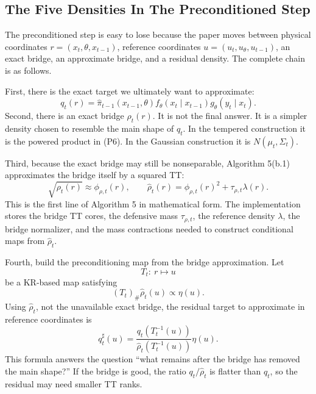 \documentclass[11pt]{article}
\begin{document}
\subsection{The Five Densities In The Preconditioned Step}

The preconditioned step is easy to lose because the paper moves between
physical coordinates \(r=(x_t,\theta,x_{t-1})\), reference coordinates
\(u=(u_t,u_\theta,u_{t-1})\), an exact bridge, an approximate bridge, and a
residual density.  The complete chain is as follows.

First, there is the exact target we ultimately want to approximate:
\[
    q_t(r)
    =
    \widehat\pi_{t-1}(x_{t-1},\theta)
    f_\theta(x_t\mid x_{t-1})
    g_\theta(y_t\mid x_t).
    \tag{P7a}
\]
Second, there is an exact bridge \(\rho_t(r)\).  It is not the final answer.
It is a simpler density chosen to resemble the main shape of \(q_t\).  In the
tempered construction it is the powered product in (P6).  In the Gaussian
construction it is \(N(\mu_t,\Sigma_t)\).

Third, because the exact bridge may still be nonseparable, Algorithm 5(b.1)
approximates the bridge itself by a squared TT:
\[
    \sqrt{\rho_t(r)}\approx \phi_{\rho,t}(r),
    \qquad
    \widehat\rho_t(r)
    =
    \phi_{\rho,t}(r)^2+\tau_{\rho,t}\lambda(r).
    \tag{P7b}
\]
This is the first line of Algorithm 5 in mathematical form.  The implementation
stores the bridge TT cores, the defensive mass \(\tau_{\rho,t}\), the reference
density \(\lambda\), the bridge normalizer, and the mass contractions needed to
construct conditional maps from \(\widehat\rho_t\).

Fourth, build the preconditioning map from the bridge approximation.  Let
\[
    T_t:\ r\mapsto u
    \tag{P7c}
\]
be a KR-based map satisfying
\[
    (T_t)_\#\widehat\rho_t(u)\propto \eta(u).
    \tag{P7d}
\]
Using \(\widehat\rho_t\), not the unavailable exact bridge, the residual target
to approximate in reference coordinates is
\[
    q_t^\sharp(u)
    =
    \frac{q_t(T_t^{-1}(u))}
    {\widehat\rho_t(T_t^{-1}(u))}
    \eta(u).
    \tag{P7e}
\]
This formula answers the question ``what remains after the bridge has removed
the main shape?''  If the bridge is good, the ratio \(q_t/\widehat\rho_t\) is
flatter than \(q_t\), so the residual may need smaller TT ranks.
\end{document}
